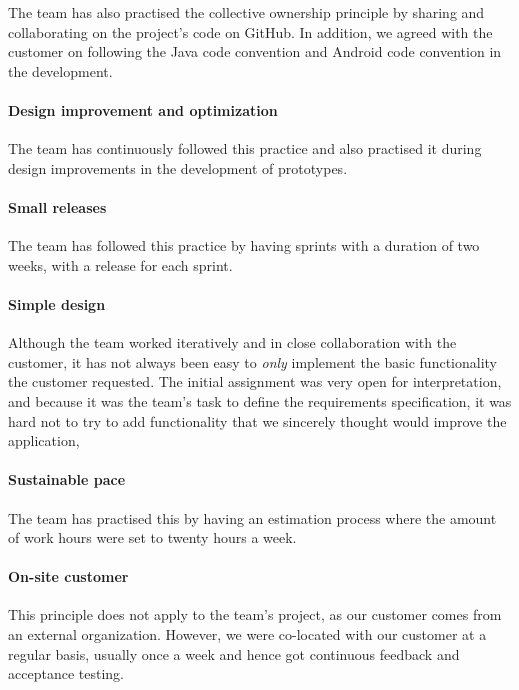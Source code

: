 The team has also practised the collective ownership principle by sharing and collaborating on the project's code on GitHub. In addition, we agreed with the customer on following the Java code convention and Android code convention in the development.

\paragraph{Design improvement and optimization}
The team has continuously followed this practice and also practised it during design improvements in the development of prototypes.
 
\paragraph{Small releases}
The team has followed this practice by having sprints with a duration of two weeks, with a release for each sprint.


\paragraph{Simple design}
Although the team worked iteratively and in close collaboration with the customer, it has not always been easy to \emph{only} implement the basic functionality the customer requested. The initial assignment was very open for interpretation, and because it was the team's task to define the requirements specification, it was hard not to try to add functionality that we sincerely thought would improve the application, 

\paragraph{Sustainable pace}
The team has practised this by having an estimation process where the amount of work hours were set to twenty hours a week.

\paragraph{On-site customer}
This principle does not apply to the team's project, as our customer comes from an external organization. However, we were co-located with our customer at a regular basis, usually once a week and hence got continuous feedback and acceptance testing.

